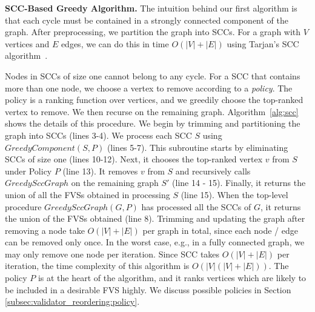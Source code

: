 \begin{algorithm}[t]
	\SetAlgoLined\DontPrintSemicolon
	\caption{Sort-based greedy algorithm}
	\label{alg:sort}
\end{algorithm}

{\bf SCC-Based Greedy Algorithm.} The intuition behind our first algorithm is that each cycle must be contained in a strongly connected component of the graph. After preprocessing, we partition the graph into SCCs. For a graph with $V$ vertices and $E$ edges, we can do this in time $O(|V|+|E|)$ using Tarjan's SCC algorithm~\cite{tarjan1972depth}.

Nodes in SCCs of size one cannot belong to any cycle. For a SCC that contains
more than one node, we choose a vertex to remove according to a \emph{policy}. The policy is a ranking function over vertices, and we greedily choose the top-ranked vertex to remove. We then recurse on the remaining graph. Algorithm~\ref{alg:scc} shows the details of this procedure. We begin by trimming and partitioning the graph into SCCs  (lines 3-4). We process each SCC $S$ using $GreedyComponent(S, P)$ (lines 5-7). This subroutine starts by eliminating SCCs of size one (lines 10-12). Next, it chooses the top-ranked vertex $v$ from $S$ under Policy $P$ (line 13). It removes $v$ from $S$ and recursively calls $GreedySccGraph$ on the remaining graph $S'$ (line 14 - 15). Finally, it returns the union of all the FVSs obtained in processing $S$ (line 15). When the top-level procedure $GreedySccGraph(G, P)$ has processed all the SCCs of $G$, it returns the union of the FVSs obtained (line 8).
Trimming and updating the graph after removing a node take $O(|V| + |E|)$ per
graph in total, since each node / edge can be removed only once. In the worst case, e.g., in a fully connected graph, we may only remove one node per iteration. Since SCC takes $O(|V|+|E|)$ per iteration, the time complexity of this algorithm is $O(|V|(|V|+|E|))$.
The policy $P$ is at the heart of the algorithm, and it ranks vertices which are likely to be included in a desirable FVS highly. We discuss possible policies in Section \ref{subsec:validator_reordering:policy}.

